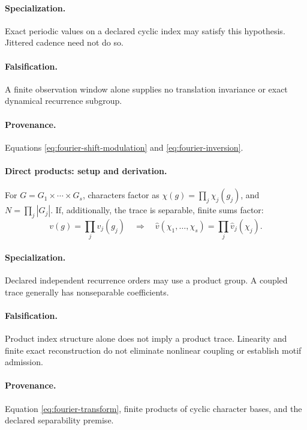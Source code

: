 \paragraph{Specialization.} Exact periodic values on a declared cyclic
index may satisfy this hypothesis. Jittered cadence need not do so.
\paragraph{Falsification.} A finite observation window alone supplies no
translation invariance or exact dynamical recurrence subgroup.
\paragraph{Provenance.} Equations \eqref{eq:fourier-shift-modulation} and
\eqref{eq:fourier-inversion}.

\paragraph{Direct products: setup and derivation.}
For \(G=G_1\times\cdots\times G_s\), characters factor as
\(\chi(g)=\prod_j\chi_j(g_j)\), and \(N=\prod_j|G_j|\).
If, additionally, the trace is separable, finite sums factor:
\begin{equation}
v(g)=\prod_j v_j(g_j)
\quad\Longrightarrow\quad
\widehat v(\chi_1,\ldots,\chi_s)=\prod_j\widehat v_j(\chi_j).
\label{eq:fourier-product-factorization}
\end{equation}
\paragraph{Specialization.} Declared independent recurrence orders may use
a product group. A coupled trace generally has nonseparable coefficients.
\paragraph{Falsification.} Product index structure alone does not imply a
product trace. Linearity and finite exact reconstruction do not eliminate
nonlinear coupling or establish motif admission.
\paragraph{Provenance.} Equation \eqref{eq:fourier-transform}, finite products
of cyclic character bases, and the declared separability premise.
